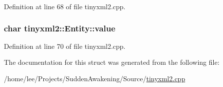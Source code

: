 Definition at line 68 of file tinyxml2.\-cpp.

\hypertarget{structtinyxml2_1_1_entity_a7334e81e33b4615655a403711b24f3ed}{
\subsubsection[{value}]{\setlength{\rightskip}{0pt plus 5cm}char tinyxml2\-::\-Entity\-::value}}\label{structtinyxml2_1_1_entity_a7334e81e33b4615655a403711b24f3ed}


Definition at line 70 of file tinyxml2.\-cpp.



The documentation for this struct was generated from the following file\-:\begin{DoxyCompactItemize}
\item 
/home/lee/\-Projects/\-Sudden\-Awakening/\-Source/\hyperlink{tinyxml2_8cpp}{tinyxml2.\-cpp}\end{DoxyCompactItemize}
